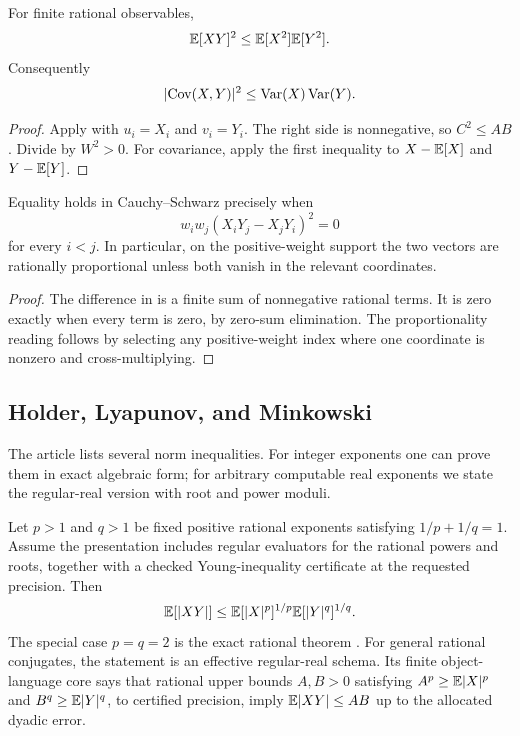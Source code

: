 \begin{theorem}\label{thm:cauchy-schwarz}
For finite rational observables,
\[
 \mathbb E[XY]^2\le\mathbb E[X^2]\mathbb E[Y^2].
\]
Consequently
\[
 \lvert \operatorname{Cov}(X,Y)\rvert^2\le\operatorname{Var}(X)\operatorname{Var}(Y).
\]
\end{theorem}

\begin{proof}
Apply  with \(u_i=X_i\) and \(v_i=Y_i\).  The right side is
nonnegative, so \(C^2\le AB\).  Divide by \(W^2>0\).  For covariance, apply
the first inequality to \(X-\mathbb E[X]\) and \(Y-\mathbb E[Y]\).
\end{proof}

\begin{corollary}\label{cor:cs-equality}
Equality holds in Cauchy--Schwarz precisely when
\[
 w_iw_j(X_iY_j-X_jY_i)^2=0
\]
for every \(i<j\).  In particular, on the positive-weight support the two
vectors are rationally proportional unless both vanish in the relevant
coordinates.
\end{corollary}

\begin{proof}
The difference in  is a finite sum of nonnegative rational
terms.  It is zero exactly when every term is zero, by zero-sum elimination.
The proportionality reading follows by selecting any positive-weight index
where one coordinate is nonzero and cross-multiplying.
\end{proof}

\subsection{Holder, Lyapunov, and Minkowski}

The article lists several norm inequalities.  For integer exponents one can
prove them in exact algebraic form; for arbitrary computable real exponents we
state the regular-real version with root and power moduli.

\begin{theorem}
\label{thm:holder}
Let \(p>1\) and \(q>1\) be fixed positive rational exponents satisfying
\(1/p+1/q=1\).  Assume the presentation includes regular evaluators for the
rational powers and roots, together with a checked Young-inequality certificate
at the requested precision.  Then
\[
 \mathbb E[\lvert XY\rvert]
 \le \mathbb E[\lvert X\rvert^p]^{1/p}\mathbb E[\lvert Y\rvert^q]^{1/q}.
\]
The special case \(p=q=2\) is the exact rational theorem
.  For general rational conjugates, the statement is
an effective regular-real schema.  Its finite object-language core says that
rational upper bounds \(A,B>0\) satisfying
\(A^p\ge\mathbb E\lvert X\rvert^p\) and \(B^q\ge\mathbb E\lvert Y\rvert^q\), to certified precision, imply
\(\mathbb E\lvert XY\rvert\le AB\) up to the allocated dyadic error.
\end{theorem}

